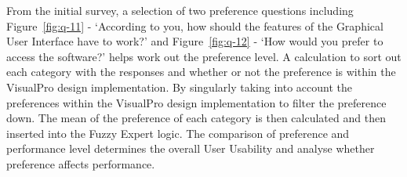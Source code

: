 \documentclass[a0,portrait]{a0poster}
\begin{document}
\begin{multicols}{2}
From the initial survey, a selection of two preference questions including Figure~\ref{fig:q-11} - `According to you, how should the features of the Graphical User Interface have to work?' and Figure~\ref{fig:q-12} - `How would you prefer to access the software?' helps work out the preference level. A calculation to sort out each category with the responses and whether or not the preference is within the VisualPro design implementation. By singularly taking into account the preferences within the VisualPro design implementation to filter the preference down. The mean of the preference of each category is then calculated and then inserted into the Fuzzy Expert logic. The comparison of preference and performance level determines the overall User Usability and analyse whether preference affects performance.


\end{multicols}
\end{document}
